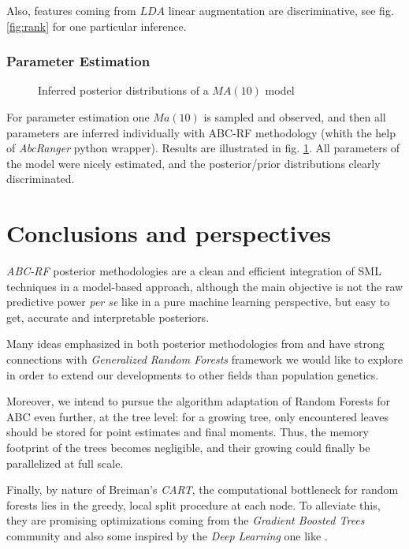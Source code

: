 \documentclass[long, final]{jobim}
\begin{document}
Also, features coming from $LDA$ linear augmentation  are discriminative, see fig. \ref{fig:rank} for one particular inference.

\subsubsection{Parameter Estimation}
\label{sec:paramestim-demo}

\begin{figure}
  \begin{center}
    \setlength{\unitlength}{5mm}
    
  \end{center}
  \caption{Inferred posterior distributions of a $MA(10)$ model}
  \label{fig:posterior-distributions}
\end{figure}

For parameter estimation one $Ma(10)$ is sampled and observed, and then all parameters are inferred individually with ABC-RF methodology (whith the help of \emph{AbcRanger} python wrapper). Results are illustrated in fig. \ref{fig:posterior-distributions}. All parameters of the model were nicely estimated, and the posterior/prior distributions clearly discriminated.

\section{Conclusions and perspectives}
\label{sec:perspectives}

\emph{ABC-RF} posterior methodologies are a clean and efficient integration of SML techniques in a model-based approach, although the main objective is not the raw predictive power \emph{per se} like in a pure machine learning perspective, but easy to get, accurate and interpretable posteriors.

Many ideas emphasized in both posterior methodologies from \cite{pudlo2015reliable} and \cite{raynal2016abc} have strong connections with \emph{Generalized Random Forests} framework \cite{Athey_2019} we would like to explore in order to extend our developments to other fields than population genetics.

Moreover, we intend to pursue the algorithm adaptation of Random Forests for ABC even further, at the tree level: for a growing tree, only encountered leaves should be stored for point estimates and final moments. Thus, the memory footprint of the trees becomes negligible, and their growing could finally be parallelized at full scale.

Finally, by nature of Breiman's \emph{CART}, the computational bottleneck for random forests lies in the greedy, local split procedure at each node. To alleviate this, they are promising optimizations coming from the \emph{Gradient Boosted Trees} community \cite{ke2017lightgbm} and also some inspired by the \emph{Deep Learning} one like \cite{kontschieder2015deep}.


\end{document}
